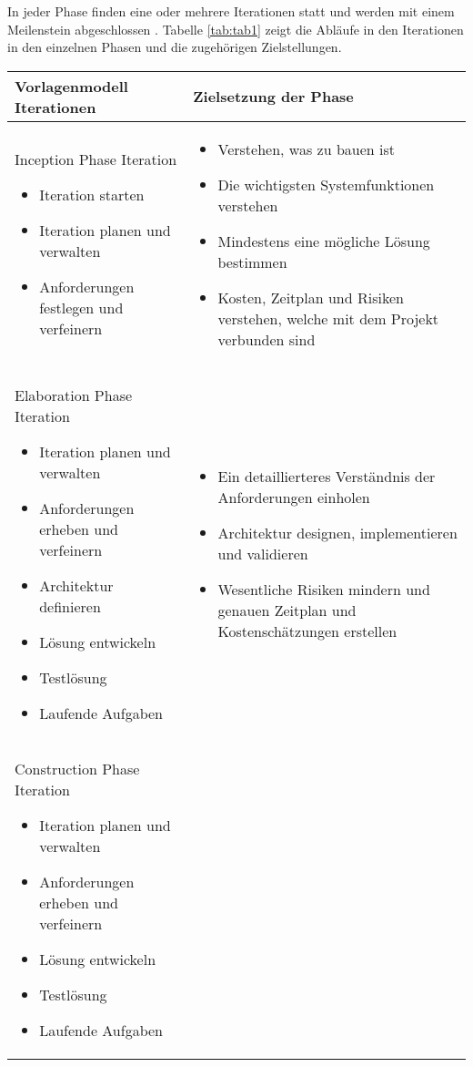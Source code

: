 In jeder Phase finden eine oder mehrere Iterationen statt und werden mit einem Meilenstein abgeschlossen \cite{Basem2010}. Tabelle \ref{tab:tab1} zeigt die Abläufe in den Iterationen in den einzelnen Phasen und die zugehörigen Zielstellungen.
\begin{longtable}{|p{7cm}|p{8cm}|}
\hline
Vorlagenmodell Iterationen & Zielsetzung der Phase \\
\hline
Inception Phase Iteration 
\begin {itemize}
\item Iteration starten 
 \item  Iteration planen und verwalten
 \item  Anforderungen festlegen und verfeinern 
  \end{itemize}
   &
  
  \begin {itemize}
\item Verstehen, was zu bauen ist
 \item Die wichtigsten Systemfunktionen verstehen 
\item Mindestens eine mögliche Lösung bestimmen
\item Kosten, Zeitplan und Risiken verstehen, welche mit dem Projekt verbunden sind
  \end{itemize}

 \\
\hline
 Elaboration Phase Iteration 
   \begin {itemize}
   \item Iteration planen und verwalten
   \item Anforderungen erheben und verfeinern
   \item Architektur definieren
   \item Lösung entwickeln
   \item Testlösung
   \item Laufende Aufgaben
   
  \end{itemize}

  & 
     \begin {itemize}
   \item Ein detaillierteres Verständnis der Anforderungen einholen
   \item Architektur designen, implementieren und validieren
   \item  Wesentliche Risiken mindern und genauen Zeitplan und Kostenschätzungen erstellen
    \end{itemize}
 \\
\hline
\hline
Construction Phase Iteration 
   \begin {itemize}
   \item Iteration planen und verwalten
   \item Anforderungen erheben und verfeinern
     \item Lösung entwickeln
   \item Testlösung
   \item Laufende Aufgaben


\end{itemize}
\end{longtable}
